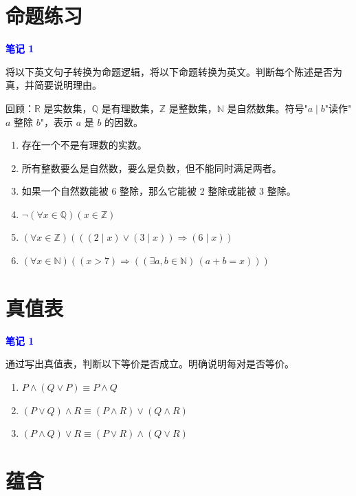 \documentclass[11pt]{article}
\begin{document}
\section{命题练习}

\textcolor{blue}{\textbf{笔记 1}}

将以下英文句子转换为命题逻辑，将以下命题转换为英文。判断每个陈述是否为真，并简要说明理由。

回顾：$\mathbb{R}$ 是实数集，$\mathbb{Q}$ 是有理数集，$\mathbb{Z}$ 是整数集，$\mathbb{N}$ 是自然数集。符号"$a \mid b$"读作"$a$ 整除 $b$"，表示 $a$ 是 $b$ 的因数。

\begin{enumerate}[label=(\alph*)]
\item 存在一个不是有理数的实数。

\item 所有整数要么是自然数，要么是负数，但不能同时满足两者。

\item 如果一个自然数能被 6 整除，那么它能被 2 整除或能被 3 整除。

\item $\neg(\forall x \in \mathbb{Q})(x \in \mathbb{Z})$

\item $(\forall x \in \mathbb{Z})(((2 \mid x) \lor (3 \mid x)) \Rightarrow (6 \mid x))$

\item $(\forall x \in \mathbb{N})((x > 7) \Rightarrow ((\exists a,b \in \mathbb{N})\, (a+b = x)))$
\end{enumerate}

\section{真值表}

\textcolor{blue}{\textbf{笔记 1}}

通过写出真值表，判断以下等价是否成立。明确说明每对是否等价。

\begin{enumerate}[label=(\alph*)]
\item $P \land (Q \lor P) \equiv P \land Q$

\item $(P \lor Q) \land R \equiv (P \land R) \lor (Q \land R)$

\item $(P \land Q) \lor R \equiv (P \lor R) \land (Q \lor R)$
\end{enumerate}

\section{蕴含}
\end{document}
